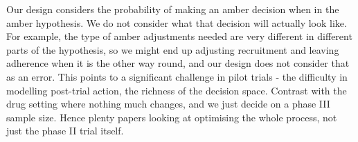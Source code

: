 \documentclass{article} %
\begin{document}
Our design considers the probability of making an amber decision when in the amber hypothesis. We do not consider what that decision will actually look like. For example, the type of amber adjustments needed are very different in different parts of the hypothesis, so we might end up adjusting recruitment and leaving adherence when it is the other way round, and our design does not consider that as an error. This points to a significant challenge in pilot trials - the difficulty in modelling post-trial action, the richness of the decision space. Contrast with the drug setting where nothing much changes, and we just decide on a phase III sample size. Hence plenty papers looking at optimising the whole process, not just the phase II trial itself.




\end{document}
